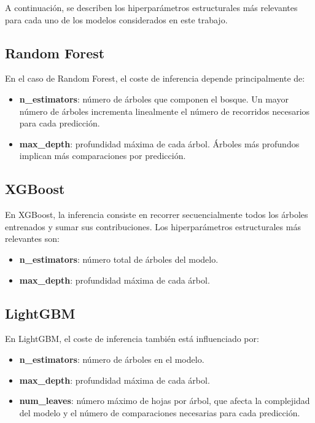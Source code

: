 A continuación, se describen los hiperparámetros estructurales más relevantes para cada uno de los modelos considerados en este trabajo.

\subsection{Random Forest}

En el caso de Random Forest, el coste de inferencia depende principalmente de:

\begin{itemize}
    \item \textbf{n\_estimators}: número de árboles que componen el bosque. Un mayor número de árboles incrementa linealmente el número de recorridos necesarios para cada predicción.
    \item \textbf{max\_depth}: profundidad máxima de cada árbol. Árboles más profundos implican más comparaciones por predicción.
\end{itemize}

\subsection{XGBoost}

En XGBoost, la inferencia consiste en recorrer secuencialmente todos los árboles entrenados y sumar sus contribuciones. Los hiperparámetros estructurales más relevantes son:

\begin{itemize}
    \item \textbf{n\_estimators}: número total de árboles del modelo.
    \item \textbf{max\_depth}: profundidad máxima de cada árbol.
\end{itemize}

\subsection{LightGBM}

En LightGBM, el coste de inferencia también está influenciado por:
\begin{itemize}
    \item \textbf{n\_estimators}: número de árboles en el modelo.
    \item \textbf{max\_depth}: profundidad máxima de cada árbol.
    \item \textbf{num\_leaves}: número máximo de hojas por árbol, que afecta la complejidad del modelo y el número de comparaciones necesarias para cada predicción.
\end{itemize}

